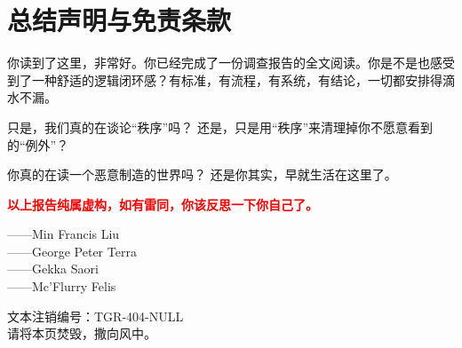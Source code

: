 \documentclass[]{ctexrep}
\begin{document}
	\chapter*{总结声明与免责条款}
	
	你读到了这里，非常好。你已经完成了一份调查报告的全文阅读。你是不是也感受到了一种舒适的逻辑闭环感？有标准，有流程，有系统，有结论，一切都安排得滴水不漏。
	
	只是，我们真的在谈论“秩序”吗？
	还是，只是用“秩序”来清理掉你不愿意看到的“例外”？
	
	你真的在读一个恶意制造的世界吗？
	还是你其实，早就生活在这里了。
	
	\begin{center}
		\textcolor{red}{{\Large \textbf{以上报告纯属虚构，如有雷同，你该反思一下你自己了。}}}
	\end{center}
	\vspace{3in}
	\begin{flushright}
		——Min Francis Liu\\
		——George Peter Terra\\
		——Gekka Saori\\
		——Mc'Flurry Felis\\
	\end{flushright}
	{\Large 文本注销编号：TGR-404-NULL\\
		请将本页焚毁，撒向风中。}
	
	
	
	
	
\end{document}
